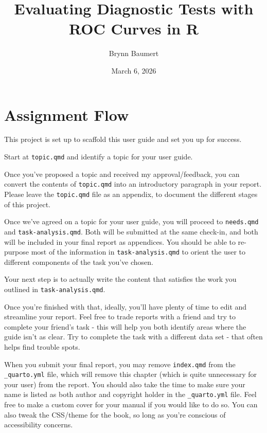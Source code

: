 \documentclass[
  letterpaper,
  DIV=11,
  numbers=noendperiod]{scrreprt}
\title{Evaluating Diagnostic Tests with ROC Curves in R}
\author{Brynn Baumert}
\date{March 6, 2026}
\renewcommand*\contentsname{Table of contents}
\newcommand\contentsname{Table of contents}
\begin{document}
\maketitle

\renewcommand*\contentsname{Table of contents}
{
\hypersetup{linkcolor=}
\setcounter{tocdepth}{2}
\tableofcontents
}


\chapter*{Assignment Flow}\label{assignment-flow}


This project is set up to scaffold this user guide and set you up for
success.

Start at \texttt{topic.qmd} and identify a topic for your user guide.

Once you've proposed a topic and received my approval/feedback, you can
convert the contents of \texttt{topic.qmd} into an introductory
paragraph in your report. Please leave the \texttt{topic.qmd} file as an
appendix, to document the different stages of this project.

Once we've agreed on a topic for your user guide, you will proceed to
\texttt{needs.qmd} and \texttt{task-analysis.qmd}. Both will be
submitted at the same check-in, and both will be included in your final
report as appendices. You should be able to re-purpose most of the
information in \texttt{task-analysis.qmd} to orient the user to
different components of the task you've chosen.

Your next step is to actually write the content that satisfies the work
you outlined in \texttt{task-analysis.qmd}.

Once you're finished with that, ideally, you'll have plenty of time to
edit and streamline your report. Feel free to trade reports with a
friend and try to complete your friend's task - this will help you both
identify areas where the guide isn't as clear. Try to complete the task
with a different data set - that often helps find trouble spots.

When you submit your final report, you may remove \texttt{index.qmd}
from the \texttt{\_quarto.yml} file, which will remove this chapter
(which is quite unnecessary for your user) from the report. You should
also take the time to make sure your name is listed as both author and
copyright holder in the \texttt{\_quarto.yml} file. Feel free to make a
custom cover for your manual if you would like to do so. You can also
tweak the CSS/theme for the book, so long as you're conscious of
accessibility concerns.
\end{document}
